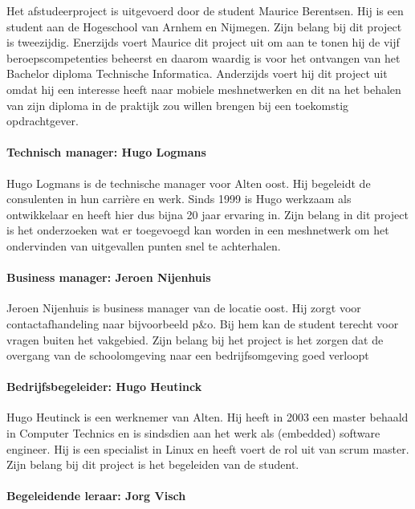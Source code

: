 \documentclass[a4paper, 11pt, oneside]{report}
\begin{document}
Het afstudeerproject is uitgevoerd door de student Maurice Berentsen. 
Hij is een student aan de Hogeschool van Arnhem en Nijmegen. 
Zijn belang bij dit project is tweezijdig. 
Enerzijds voert Maurice dit project uit om aan te tonen hij de vijf beroepscompetenties beheerst en daarom waardig is voor het ontvangen van het Bachelor diploma Technische Informatica. 
Anderzijds voert hij dit project uit omdat hij een interesse heeft naar mobiele meshnetwerken en dit na het behalen van zijn diploma in de praktijk zou willen brengen bij een toekomstig opdrachtgever. 

\paragraph{Technisch manager: Hugo Logmans}

Hugo Logmans is de technische manager voor Alten oost. Hij begeleidt de consulenten in hun carrière en werk. Sinds 1999 is Hugo werkzaam als ontwikkelaar en heeft hier dus bijna 20 jaar ervaring in. Zijn belang in dit project is het onderzoeken wat er toegevoegd kan worden in een meshnetwerk om het ondervinden van uitgevallen punten snel te achterhalen.

\paragraph{Business manager: Jeroen Nijenhuis}
Jeroen Nijenhuis is business manager van de locatie oost. Hij zorgt voor contactafhandeling naar bijvoorbeeld p\&o. Bij hem kan de student terecht voor vragen buiten het vakgebied. Zijn belang bij het project is het zorgen dat de overgang van de schoolomgeving naar een bedrijfsomgeving goed verloopt 

\paragraph{Bedrijfsbegeleider: Hugo Heutinck}

Hugo Heutinck is een werknemer van Alten. Hij heeft in 2003 een master behaald in Computer Technics en is sindsdien aan het werk als (embedded) software engineer. Hij is een specialist in Linux en heeft voert de rol uit van scrum master. Zijn belang bij dit project is het begeleiden van de student.

\paragraph{Begeleidende leraar: Jorg Visch}
 
\end{document}
